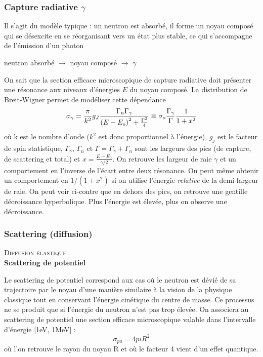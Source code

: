 \subsubsection{Capture radiative $\gamma$}
Il s'agit du modèle typique : un neutron est absorbé, il forme un noyau composé qui se 
désexcite en se réorganisant vers un état plus stable, ce qui s'accompagne de l'émission d'un photon
\begin{center}
neutron absorbé $\longrightarrow$ noyau composé $\longrightarrow$ $\gamma$
\end{center}
On sait que la section efficace microscopique de capture radiative doit présenter une résonance
aux niveaux d'énergies $E$ du noyau composé. La distribution de Breit-Wigner permet de modéliser cette dépendance
\begin{equation}
{\sigma _\gamma } = \frac{\pi }{{{k^2}}}{g_J}\frac{{{\Gamma _n}{\Gamma _\gamma }}}{{{{(E - {E_o})}^2} + {\textstyle{{{\Gamma ^2}} \over 4}}}} \equiv {\sigma _o}\frac{{{\Gamma _\gamma }}}{\Gamma }\frac{1}{{1 + {x^2}}}
\end{equation}
où k est le nombre d'onde ($k^2$ est donc proportionnel à l'énergie), $g_j$ est le facteur de spin statistique,
$\Gamma_\gamma$, $\Gamma_n$ et $\Gamma = \Gamma_\gamma + \Gamma_n$ sont les largeurs des pics (de capture, de scattering
et total) et  $x= \frac{E-E_0}{\gamma/2}$. On retrouve les largeur de raie $\gamma$ et un comportement en 
l'inverse de l'écart entre deux résonance. On peut même obtenir un comportement en $1/(1+x^2)$ si 
on utilise l'énergie \textit{relative} de la demi-largeur de raie. On peut voir ci-contre que 
en dehors des pics, on retrouve une gentille décroissance hyperbolique. Plus l'énergie est élevée, 
plus on observe une décroissance.

\subsubsection{Scattering (diffusion)}
\textsc{Diffusion élastique}\\
\textbf{Scattering de potentiel}

Le scattering de potentiel correspond aux cas où le neutron est dévié de sa trajectoire par le noyau
d'une manière similaire à la vision de la physique classique tout en conservant l'énergie cinétique
du centre de masse. Ce processus ne se produit que si l'énergie du neutron n'est pas trop élevée.
On associera au scattering de potentiel une section efficace microscopique valable dans l'intervalle
d'énergie [1eV, 1MeV] :
\begin{equation}
\sigma_{pa} = 4 pi R^2
\end{equation}
où l'on retrouve le rayon du noyau R et où le facteur 4 vient d'un effet quantique.\\

